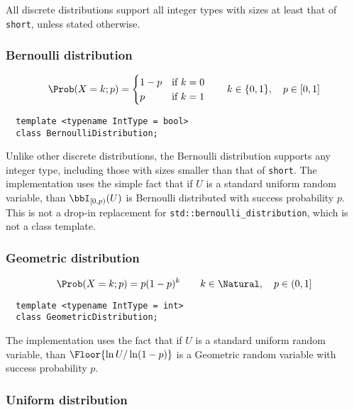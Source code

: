 All discrete distributions support all integer types with sizes at least that
of \verb|short|, unless stated otherwise.

\subsubsection{Bernoulli distribution}

\begin{equation*}
  \Prob(X = k;p) = \begin{cases}
    1 - p &\text{if } k = 0\\
    p     &\text{if } k = 1
  \end{cases} \qquad
  k \in \{0, 1\},\quad p \in [0, 1]
\end{equation*}
\begin{Verbatim}
  template <typename IntType = bool>
  class BernoulliDistribution;
\end{Verbatim}
Unlike other discrete distributions, the Bernoulli distribution supports any
integer type, including those with sizes smaller than that of \verb|short|. The
implementation uses the simple fact that if $U$ is a standard uniform random
variable, than $\bbI_{[0,p)}(U)$ is Bernoulli distributed with success
probability $p$. This is not a drop-in replacement for
\verb|std::bernoulli_distribution|, which is not a class template.

\subsubsection{Geometric distribution}

\begin{equation*}
  \Prob(X = k;p) = p(1-p)^k \qquad
  k \in \Natural,\quad p \in (0, 1]
\end{equation*}
\begin{Verbatim}
  template <typename IntType = int>
  class GeometricDistribution;
\end{Verbatim}
The implementation uses the fact that if $U$ is a standard uniform random
variable, than $\Floor{\ln U / \ln(1-p)}$ is a Geometric random variable with
success probability $p$.

\subsubsection{Uniform distribution}

